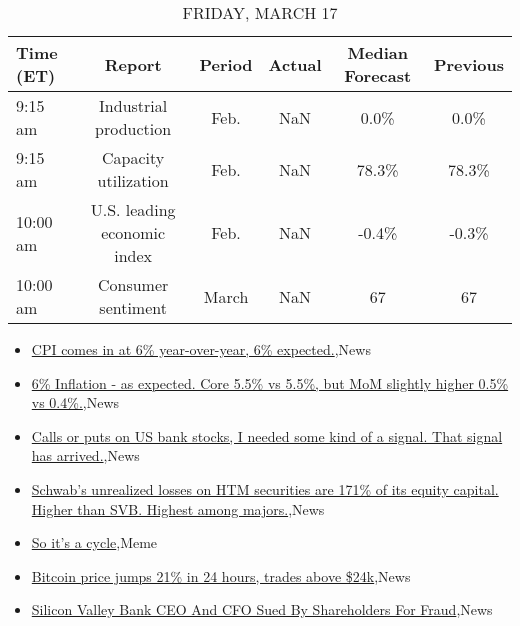 \documentclass{article}%
\begin{document}
%


\begin{table}[htbp]%
\caption{FRIDAY, MARCH 17}%
\centering%
\begin{adjustbox}{width=1\textwidth}%
\begin{tabular}{lccccc}
\toprule
Time (ET) &                      Report & Period & Actual & Median Forecast & Previous \\
\midrule
  9:15 am &       Industrial production &   Feb. &    NaN &            0.0\% &     0.0\% \\
  9:15 am &        Capacity utilization &   Feb. &    NaN &           78.3\% &    78.3\% \\
 10:00 am & U.S. leading economic index &   Feb. &    NaN &           -0.4\% &    -0.3\% \\
 10:00 am &          Consumer sentiment &  March &    NaN &              67 &       67 \\
\bottomrule
\end{tabular}
%
\end{adjustbox}%
\end{table}

%
\begin{itemize}%
\item%
\href{https://reddit.com/r/wallstreetbets/comments/11r4w30/cpi\_comes\_in\_at\_6\_yearoveryear\_6\_expected/}{CPI comes in at 6\% year-over-year, 6\% expected.},News%
\item%
\href{https://reddit.com/r/wallstreetbets/comments/11r4vdp/6\_inflation\_as\_expected\_core\_55\_vs\_55\_but\_mom/}{6\% Inflation - as expected. Core 5.5\% vs 5.5\%, but MoM slightly higher 0.5\% vs 0.4\%.},News%
\item%
\href{https://reddit.com/r/wallstreetbets/comments/11r46de/calls\_or\_puts\_on\_us\_bank\_stocks\_i\_needed\_some/}{Calls or puts on US bank stocks, I needed some kind of a signal. That signal has arrived.},News%
\item%
\href{https://reddit.com/r/wallstreetbets/comments/11r3hwm/schwabs\_unrealized\_losses\_on\_htm\_securities\_are/}{Schwab's unrealized losses on HTM securities are 171\% of its equity capital. Higher than SVB. Highest among majors.},News%
\item%
\href{https://reddit.com/r/wallstreetbets/comments/11r321a/so\_its\_a\_cycle/}{So it's a cycle},Meme%
\item%
\href{https://reddit.com/r/wallstreetbets/comments/11r2k4y/bitcoin\_price\_jumps\_21\_in\_24\_hours\_trades\_above/}{Bitcoin price jumps 21\% in 24 hours, trades above \$24k},News%
\item%
\href{https://reddit.com/r/Economics/comments/11r2fip/silicon\_valley\_bank\_ceo\_and\_cfo\_sued\_by/}{Silicon Valley Bank CEO And CFO Sued By Shareholders For Fraud},News%
\end{itemize}%
\end{document}
